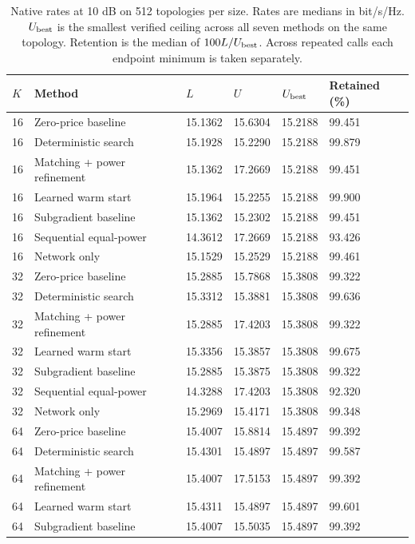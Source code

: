 \documentclass[10pt,letterpaper]{article}
\begin{document}
\begin{table}[htbp]\centering\small
\setlength{\tabcolsep}{4pt}
\caption{Native rates at 10 dB on 512 topologies per size. Rates are medians in bit/s/Hz. $U_{\rm best}$ is the smallest verified ceiling across all seven methods on the same topology. Retention is the median of $100 L/U_{\rm best}$. Across repeated calls each endpoint minimum is taken separately.}\label{supp:rates}
\begin{tabular}{llllll}\toprule
$K$ & Method & $L$ & $U$ & $U_{\rm best}$ & Retained (\%)\\
\midrule
16 & Zero-price baseline & 15.1362 & 15.6304 & 15.2188 & 99.451\\
16 & Deterministic search & 15.1928 & 15.2290 & 15.2188 & 99.879\\
16 & Matching + power refinement & 15.1362 & 17.2669 & 15.2188 & 99.451\\
16 & Learned warm start & 15.1964 & 15.2255 & 15.2188 & 99.900\\
16 & Subgradient baseline & 15.1362 & 15.2302 & 15.2188 & 99.451\\
16 & Sequential equal-power & 14.3612 & 17.2669 & 15.2188 & 93.426\\
16 & Network only & 15.1529 & 15.2529 & 15.2188 & 99.461\\
32 & Zero-price baseline & 15.2885 & 15.7868 & 15.3808 & 99.322\\
32 & Deterministic search & 15.3312 & 15.3881 & 15.3808 & 99.636\\
32 & Matching + power refinement & 15.2885 & 17.4203 & 15.3808 & 99.322\\
32 & Learned warm start & 15.3356 & 15.3857 & 15.3808 & 99.675\\
32 & Subgradient baseline & 15.2885 & 15.3875 & 15.3808 & 99.322\\
32 & Sequential equal-power & 14.3288 & 17.4203 & 15.3808 & 92.320\\
32 & Network only & 15.2969 & 15.4171 & 15.3808 & 99.348\\
64 & Zero-price baseline & 15.4007 & 15.8814 & 15.4897 & 99.392\\
64 & Deterministic search & 15.4301 & 15.4897 & 15.4897 & 99.587\\
64 & Matching + power refinement & 15.4007 & 17.5153 & 15.4897 & 99.392\\
64 & Learned warm start & 15.4311 & 15.4897 & 15.4897 & 99.601\\
64 & Subgradient baseline & 15.4007 & 15.5035 & 15.4897 & 99.392\\

\end{tabular}
\end{table}
\end{document}
